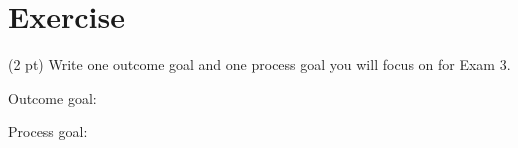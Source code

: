 %
%
%
%

\section{Exercise}

(2 pt) Write one outcome goal and one process goal you will focus on for Exam 3.

\vspace{0.25in}

\noindent{}Outcome goal:

\vspace{1in}

\noindent{}Process goal:

\vspace{1in}